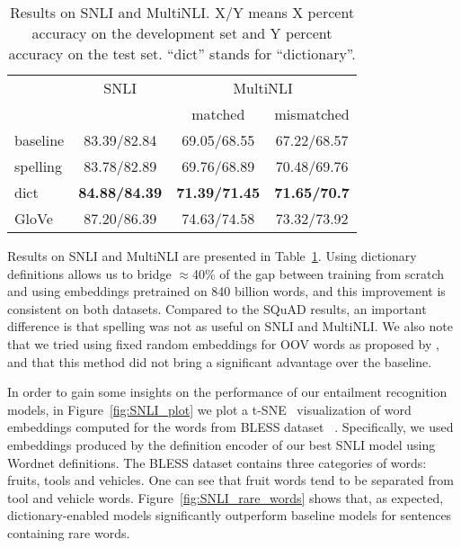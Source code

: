 \begin{table}
\caption{\label{tab:snli_results}Results on SNLI and MultiNLI. X/Y means X percent accuracy on the development set and Y percent accuracy on the test set. ``dict'' stands for ``dictionary''.
}
\centering
\begin{tabular}{lccc}
\toprule
 & SNLI & \multicolumn{2}{c}{MultiNLI} \\
{} &      &  matched & mismatched \\
\midrule
baseline        &  83.39/82.84 &  69.05/68.55 & 67.22/68.57 \\
\midrule
spelling   &  83.78/82.89 &  69.76/68.89 & 70.48/69.76  \\
dict            &  \textbf{84.88/84.39} & \textbf{71.39/71.45} & \textbf{71.65/70.7} \\
\midrule
GloVe           &  87.20/86.39 & 74.63/74.58 & 73.32/73.92 \\
\bottomrule
\end{tabular}
\end{table}



Results on SNLI and MultiNLI are presented in Table~\ref{tab:snli_results}. Using dictionary definitions allows us to bridge $\approx$40\% of the gap between training from scratch and using embeddings pretrained on 840 billion words, and this improvement is consistent on both datasets. Compared to the SQuAD results, an important difference is that spelling was not as useful on SNLI and MultiNLI. We also note that we tried using fixed random embeddings for OOV words as proposed by \citep{dhingra_comparative_2017}, and that this method did not bring a significant advantage over the baseline.

In order to gain some insights on the performance of our entailment recognition models, in Figure~\ref{fig:SNLI_plot} we plot a t-SNE~\citep{maaten2008visualizing} visualization of word embeddings computed for the words from BLESS dataset ~\citep{Baroni:2011:WBD:2140490.2140491}. Specifically, we used embeddings produced by the definition encoder of our best SNLI model using Wordnet definitions. The BLESS dataset contains three categories of words: fruits, tools and vehicles.
One can see that fruit words tend to be separated from tool and vehicle words. 
Figure~\ref{fig:SNLI_rare_words} shows that, as expected, dictionary-enabled models significantly outperform baseline models for sentences containing rare words. 

